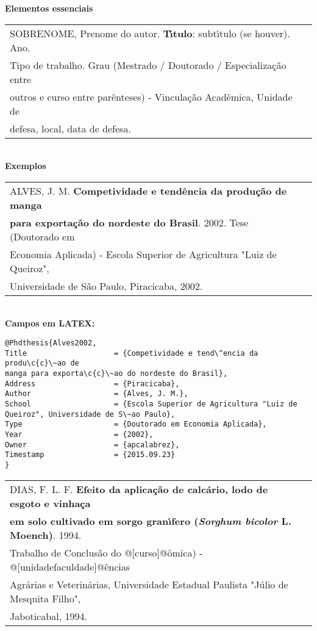 \textbf{Elementos essenciais}\\

\begin{tabular}{|l|c|} \hline
	SOBRENOME, Prenome do autor. \textbf{T\'{\i}tulo}: subt\'{\i}tulo (se houver). Ano. \\ Tipo de trabalho. Grau (Mestrado / Doutorado / Especializa\c{c}\~ao entre \\ outros e curso entre par\^enteses) - Vincula\c{c}\~ao Acad\^emica, Unidade de \\ defesa, local, data de defesa.\\\hline
\end{tabular}\\

\textbf{Exemplos}\\

\begin{tabular}{|l|c|} \hline
	ALVES, J. M. \textbf{Competividade e tend\^encia da produ\c{c}\~ao de manga} \\ \textbf{para exporta\c{c}\~ao do nordeste do Brasil}. 2002. Tese (Doutorado em \\ Economia Aplicada) - Escola Superior de Agricultura "Luiz de Queiroz", \\ Universidade de S\~ao Paulo, Piracicaba, 2002.    \\\hline
\end{tabular} \\

\textbf{Campos em LATEX:}

\begin{verbatim}
@Phdthesis{Alves2002,
Title                    = {Competividade e tend\^encia da produ\c{c}\~ao de 
manga para exporta\c{c}\~ao do nordeste do Brasil},
Address                  = {Piracicaba},
Author                   = {Alves, J. M.},
School                   = {Escola Superior de Agricultura "Luiz de 
Queiroz", Universidade de S\~ao Paulo},
Type                     = {Doutorado em Economia Aplicada},
Year                     = {2002},
Owner                    = {apcalabrez},
Timestamp                = {2015.09.23}
}
\end{verbatim} 

\begin{tabular}{|l|c|} \hline
	DIAS, F. L. F. \textbf{Efeito da aplica\c{c}\~ao de calc\'ario, lodo de esgoto e vinha\c{c}a} \\ \textbf{em solo cultivado em sorgo gran\'{\i}fero (\textit{Sorghum bicolor} L. Moench)}. 1994. \\ Trabalho de Conclus\~ao do @[curso]@\^omica) - @[unidadefaculdade]@\^encias\\  Agr\'arias e Veterin\'arias, Universidade Estadual Paulista "J\'ulio de Mesquita Filho", \\ Jaboticabal, 1994.     \\\hline
\end{tabular} \\

